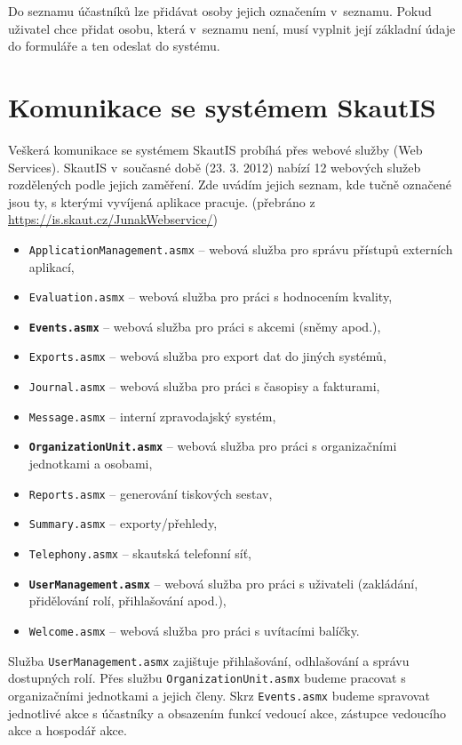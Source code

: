 \documentclass[thesis=B,czech]{FITthesis}[2011/06/14]
\begin{document}
Do seznamu účastníků lze přidávat osoby jejich označením v~seznamu. Pokud uživatel chce přidat osobu, která v~seznamu není, musí vyplnit její základní údaje do formuláře a ten odeslat do systému.

\section{Komunikace se systémem SkautIS}\label{sec:skautisComunication}
Veškerá komunikace se systémem SkautIS probíhá přes webové služby (Web Services). SkautIS v~současné době (23. 3. 2012) nabízí 12 webových služeb rozdělených podle jejich zaměření. Zde uvádím jejich seznam, kde tučně označené jsou ty, s kterými vyvíjená aplikace pracuje. (přebráno z \url{https://is.skaut.cz/JunakWebservice/})
\begin{itemize}
	\item \texttt{ApplicationManagement.asmx} -- webová služba pro správu přístupů externích aplikací,
	\item \texttt{Evaluation.asmx} -- webová služba pro práci s hodnocením kvality,
	\item \texttt{\textbf{Events.asmx}} -- webová služba pro práci s akcemi (sněmy apod.),
	\item \texttt{Exports.asmx} -- webová služba pro export dat do jiných systémů,
	\item \texttt{Journal.asmx} -- webová služba pro práci s časopisy a fakturami,
	\item \texttt{Message.asmx} -- interní zpravodajský systém,
	\item \texttt{\textbf{OrganizationUnit.asmx}} -- webová služba pro práci s organizačními jednotkami a osobami,
	\item \texttt{Reports.asmx} -- generování tiskových sestav,
	\item \texttt{Summary.asmx} -- exporty/přehledy,
	\item \texttt{Telephony.asmx} -- skautská telefonní síť,
	\item \texttt{\textbf{UserManagement.asmx}} -- webová služba pro práci s uživateli (zakládání, přidělování rolí, přihlašování apod.),
	\item \texttt{Welcome.asmx} -- webová služba pro práci s uvítacími balíčky.
\end{itemize}

Služba \texttt{UserManagement.asmx} zajištuje přihlašování, odhlašování a správu dostupných rolí. Přes službu \texttt{OrganizationUnit.asmx} budeme pracovat s organizačními jednotkami a jejich členy. Skrz \texttt{Events.asmx} budeme spravovat jednotlivé akce s účastníky a obsazením funkcí vedoucí akce, zástupce vedoucího akce a hospodář akce.
\end{document}

